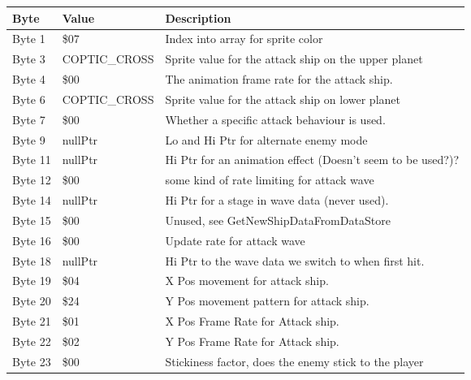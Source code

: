 \begin{figure}[H]
{\begin{adjustbox}{width=12cm}
\begin{tabular}{lll}
\toprule
 Byte    & Value              & Description                                                        \\
\midrule
 Byte 1  & \$07                & Index into array for sprite color                                  \\
 Byte 3  & COPTIC\_CROSS       & Sprite value for the attack ship on the upper planet               \\
 Byte 4  & \$00                & The animation frame rate for the attack ship.                      \\
 Byte 6  & COPTIC\_CROSS       & Sprite value for the attack ship on lower planet                   \\
 Byte 7  & \$00                & Whether a specific attack behaviour is used.                       \\
 Byte 9  & nullPtr            & Lo and Hi Ptr for alternate enemy mode                             \\
 Byte 11 & nullPtr            & Hi Ptr for an animation effect (Doesn't seem to be used?)?         \\
 Byte 12 & \$00                & some kind of rate limiting for attack wave                         \\
 Byte 14 & nullPtr            & Hi Ptr for a stage in wave data (never used).                      \\
 Byte 15 & \$00                & Unused, see GetNewShipDataFromDataStore                            \\
 Byte 16 & \$00                & Update rate for attack wave                                        \\
 Byte 18 & nullPtr            & Hi Ptr to the wave data we switch to when first hit.               \\
 Byte 19 & \$04                & X Pos movement for attack ship.                                    \\
 Byte 20 & \$24                & Y Pos movement pattern for attack ship.                            \\
 Byte 21 & \$01                & X Pos Frame Rate for Attack ship.                                  \\
 Byte 22 & \$02                & Y Pos Frame Rate for Attack ship.                                  \\
 Byte 23 & \$00                & Stickiness factor, does the enemy stick to the player              \\

\end{tabular}
\end{adjustbox}}
\end{figure}

